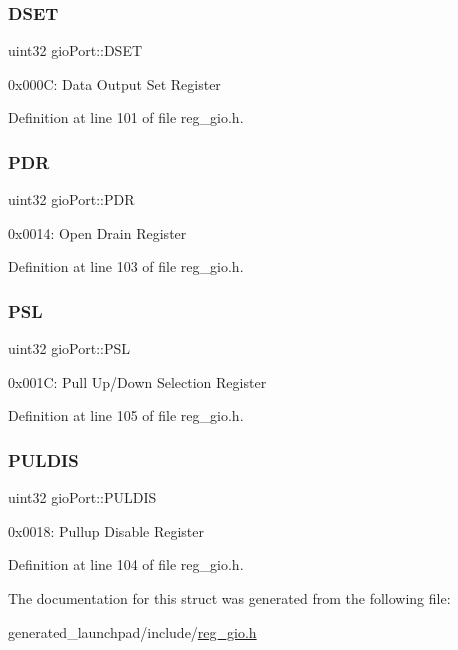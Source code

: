\subsubsection{\texorpdfstring{D\+S\+ET}{DSET}}
{\footnotesize\ttfamily uint32 gio\+Port\+::\+D\+S\+ET}

0x000C\+: Data Output Set Register 

Definition at line 101 of file reg\+\_\+gio.\+h.

\mbox{\label{structgioPort_ab00723758dea485f173b09a6a50efbaa}} 
\subsubsection{\texorpdfstring{P\+DR}{PDR}}
{\footnotesize\ttfamily uint32 gio\+Port\+::\+P\+DR}

0x0014\+: Open Drain Register 

Definition at line 103 of file reg\+\_\+gio.\+h.

\mbox{\label{structgioPort_a4372c64b0ca6aed9e2908f6195cb6581}} 
\subsubsection{\texorpdfstring{P\+SL}{PSL}}
{\footnotesize\ttfamily uint32 gio\+Port\+::\+P\+SL}

0x001C\+: Pull Up/\+Down Selection Register 

Definition at line 105 of file reg\+\_\+gio.\+h.

\mbox{\label{structgioPort_a71985cf7f14f11f0a4dff3dc91eee3e7}} 
\subsubsection{\texorpdfstring{P\+U\+L\+D\+IS}{PULDIS}}
{\footnotesize\ttfamily uint32 gio\+Port\+::\+P\+U\+L\+D\+IS}

0x0018\+: Pullup Disable Register 

Definition at line 104 of file reg\+\_\+gio.\+h.



The documentation for this struct was generated from the following file\+:\begin{DoxyCompactItemize}
\item 
generated\+\_\+launchpad/include/\mbox{\hyperlink{reg__gio_8h}{reg\+\_\+gio.\+h}}\end{DoxyCompactItemize}
